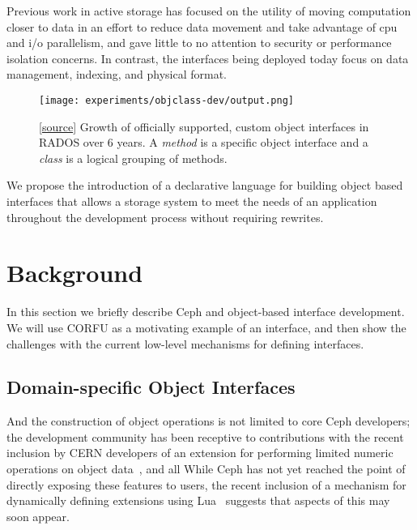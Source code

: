 \documentclass[10pt,twocolumn]{article}
\begin{document}


Previous work in active storage has focused on the utility of moving
computation closer to data in an effort to reduce data movement and take
advantage of cpu and i/o parallelism, and gave little to no attention to
security or performance isolation concerns. In contrast, the interfaces being
deployed today focus on data management, indexing, and physical format.

\begin{figure}[ht]
  \centering
    \texttt{[image: experiments/objclass-dev/output.png]}
    \caption{
[\href{https://github.com/noahdesu/zlog-popper/tree/master/experiments/objclass-dev/visualize.ipynb}{source}]
Growth of officially supported, custom object interfaces in RADOS over 6
years. A \emph{method} is a specific object interface and a \emph{class} is a
logical grouping of methods.
}
\label{fig:objclass-dev}
\end{figure}

We propose the introduction of a declarative language for building object
based interfaces that allows a storage system to meet the needs of an
application throughout the development process without requiring rewrites.

\section{Background}

In this section we briefly describe Ceph and object-based interface
development. We will use CORFU as a motivating example of an interface, and
then show the challenges with the current low-level mechanisms for defining
interfaces.

\subsection{Domain-specific Object Interfaces}

And the construction of object operations is not limited to core Ceph
developers; the development community has been receptive to contributions with
the recent inclusion by CERN developers of an extension for performing limited
numeric operations on object data~\cite{cls_numops}, and all 
While Ceph has not yet
reached the point of directly exposing these features to users, the recent
inclusion of a mechanism for dynamically defining extensions using
Lua~\cite{cls_lua} suggests that aspects of this may soon appear.
\end{document}
